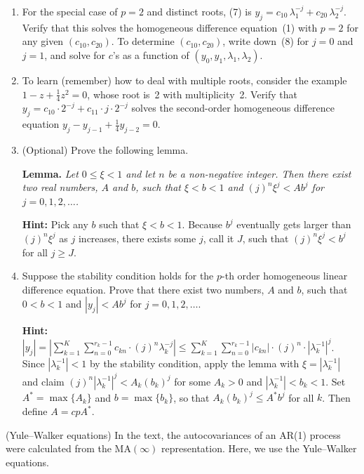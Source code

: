 \begin{problemset}
\begin{enumerate}[label=(\alph*)]
\item For the special case of $p = 2$ and distinct roots, (7) is
$y_j = c_{10}\,\lambda_1^{-j} + c_{20}\,\lambda_2^{-j}$.
Verify that this solves the homogeneous difference equation~(1) with $p = 2$
for any given $(c_{10}, c_{20})$. To determine $(c_{10}, c_{20})$, write down~(8) for $j = 0$
and $j = 1$, and solve for $c$'s as a function of $(y_0, y_1, \lambda_1, \lambda_2)$.

\item To learn (remember) how to deal with multiple roots, consider the example
$1 - z + \frac{1}{4}z^2 = 0$, whose root is~2 with multiplicity~2.
Verify that $y_j = c_{10} \cdot 2^{-j} + c_{11} \cdot j \cdot 2^{-j}$ solves the second-order homogeneous
difference equation $y_j - y_{j-1} + \frac{1}{4} y_{j-2} = 0$.

\item (Optional) \; Prove the following lemma.

\textbf{Lemma.} \emph{Let $0 \leq \xi < 1$ and let $n$ be a non-negative integer. Then there
exist two real numbers, $A$ and $b$, such that $\xi < b < 1$ and $(j)^n \xi^j < A b^j$
for $j = 0, 1, 2, \ldots$.}

\textbf{Hint:} Pick any $b$ such that $\xi < b < 1$. Because $b^j$ eventually gets
larger than $(j)^n \xi^j$ as $j$ increases, there exists some $j$, call it $J$, such that
$(j)^n \xi^j < b^j$ for all $j \geq J$.

\item Suppose the stability condition holds for the $p$-th order homogeneous linear
difference equation. Prove that there exist two numbers, $A$ and $b$, such
that $0 < b < 1$ and $|y_j| < A b^j$ for $j = 0, 1, 2, \ldots$.

\textbf{Hint:}
$|y_j| = \left|\sum_{k=1}^{K} \sum_{n=0}^{r_k-1} c_{kn} \cdot (j)^n \lambda_k^{-j}\right|
\leq \sum_{k=1}^{K} \sum_{n=0}^{r_k-1} |c_{kn}| \cdot (j)^n \cdot |\lambda_k^{-1}|^j$.
Since $|\lambda_k^{-1}| < 1$ by the stability condition, apply the lemma with $\xi = |\lambda_k^{-1}|$
and claim $(j)^n |\lambda_k^{-1}|^j < A_k (b_k)^j$ for some $A_k > 0$ and $|\lambda_k^{-1}| < b_k < 1$.
Set $A^* = \max\{A_k\}$ and $b = \max\{b_k\}$, so that $A_k(b_k)^j \leq A^* b^j$ for all $k$. Then define $A = cpA^*$.
\end{enumerate}

\exercise[5] (Yule--Walker equations) \; In the text, the autocovariances of an AR(1) process
were calculated from the $\text{MA}(\infty)$ representation. Here, we use the Yule--Walker
equations.


\end{problemset}
